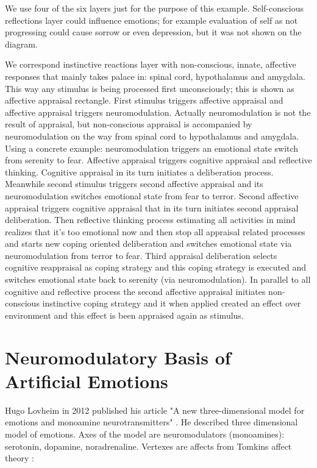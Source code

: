 We use four of the six layers just for the purpose of this example. Self-conscious reflections layer could influence emotions; for example evaluation of self as not progressing could cause sorrow or even depression, but it was not shown on the diagram.

We correspond instinctive reactions layer with non-conscious, innate, affective responses that mainly takes palace in: spinal cord, hypothalamus and amygdala. This way any stimulus is being processed first unconsciously; this is shown as affective appraisal rectangle. First stimulus triggers affective appraisal and affective appraisal triggers neuromodulation. Actually neuromodulation is not the result of appraisal, but non-conscious appraisal is accompanied by neuromodulation on the way from spinal cord to hypothalamus and amygdala.
Using a concrete example: neuromodulation triggers an emotional state switch from serenity to fear. Affective appraisal triggers cognitive appraisal and reflective thinking. Cognitive appraisal in its turn initiates a deliberation process. Meanwhile second stimulus triggers second affective appraisal and its neuromodulation switches emotional state from fear to terror. Second affective appraisal triggers cognitive appraisal that in its turn initiates second appraisal deliberation. Then reflective thinking process estimating all activities in mind realizes that it's too emotional now and then stop all appraisal related processes and starts new coping oriented deliberation and switches emotional state via neuromodulation from terror to fear. Third appraisal deliberation selects cognitive reappraisal as coping strategy and this coping strategy is executed and switches emotional state back to serenity (via neuromodulation).
In parallel to all cognitive and reflective process the second affective appraisal initiates non-conscious instinctive coping strategy and it when applied created an effect over environment and this effect is been appraised again as stimulus.

\section{Neuromodulatory Basis of Artificial Emotions}

Hugo Lovheim in 2012 published his article "A new three-dimensional model for emotions and monoamine neurotransmitters" \cite{cubeofemotions}. He described three dimensional model of emotions. Axes of the model are neuromodulators (monoamines): serotonin, dopamine, noradrenaline. Vertexes are affects from Tomkins affect theory \cite{primer_affect_psychology}:

